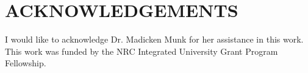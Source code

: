 \documentclass[letterpaper]{mc2023}
\begin{document}
\section*{ACKNOWLEDGEMENTS}
I would like to acknowledge Dr. Madicken Munk for her assistance in this work.
This work was funded by the NRC Integrated University Grant Program Fellowship.

\newif\ifusebibtex
\usebibtextrue

\ifusebibtex
\setlength{\baselineskip}{12pt}


\else
\setlength{\baselineskip}{12pt}
\begin{thebibliography}{300}
\bibitem{journal} B. Author(s), ``Title, using capitalization'' \emph{Journal Name in Italic}, 
  \textbf{Volume in Bold}, pp. 34-89 (20xx).
\bibitem{proc_paper} C. D. Author(s), ``Article Title,'' \emph{Proceedings of
  Meeting in Italic}, Location, Dates of Meeting, Vol. n, pp. 134-156 
  (20xx).
\bibitem{book} E. F. Author, \emph{Book Title in Italic}, Publisher, City \&
  Country (20xx). 
\bibitem{website} ``Canadian SMR Roadmap,'' \\
  \url{https://smrroadmap.ca/wp-content/uploads/2018/12/Technology-WG.pdf} (2018).
\end{thebibliography}
\fi

\end{document}
